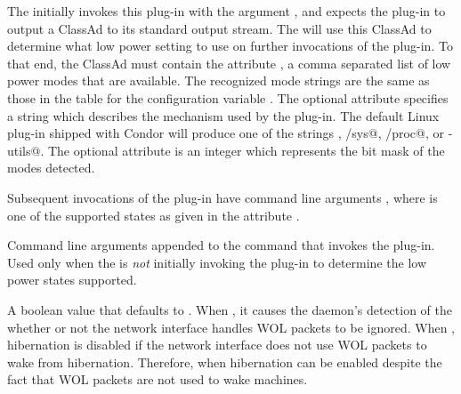 \begin{description}
  The  initially invokes this plug-in with the argument
  , and expects the plug-in to output a ClassAd to
  its standard output stream.
  The  will use this ClassAd to determine what low power
  setting to use on further invocations of the plug-in.
  To that end, the ClassAd must contain the attribute
  , a comma separated list of
  low power modes that are available.  
  The recognized mode strings are the same as those in the table for
  the configuration variable .
  The optional attribute  specifies a string 
  which describes the mechanism used by the plug-in.
  The default Linux plug-in shipped with Condor will produce 
  one of the strings
  \verb@NONE@, \verb@/sys@, \verb@/proc@, or \verb@pm-utils@.
  The optional attribute 
  is an integer which represents the bit mask of the modes detected.

  Subsequent  invocations of the plug-in have command
  line arguments , where 
  is one of the supported states as given in the attribute
  .

\label{param:HibernationPluginArgs}
\item[\Macro{HIBERNATION\_PLUGIN\_ARGS}]
  Command line arguments appended to the command that invokes the plug-in.
  Used only when the  is \emph{not} initially invoking the
  plug-in to determine the low power states supported.

\label{param:HibernationOverrideWOL}
\item[\Macro{HIBERNATION\_OVERRIDE\_WOL}]
  A boolean value that defaults to .
  When , it causes the  daemon's detection of
  the whether or not the network interface handles WOL packets to be ignored.
  When , hibernation is disabled if the network interface
  does not use WOL packets to wake from hibernation.
  Therefore, when  hibernation can be enabled despite
  the fact that WOL packets are not used to wake machines.


\end{description}
